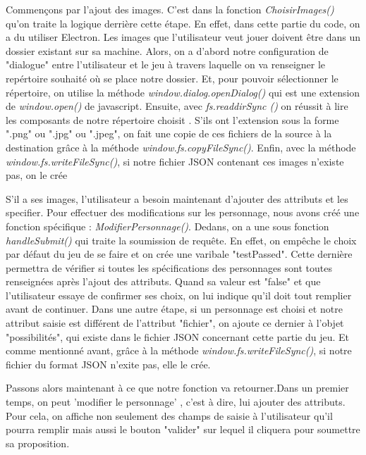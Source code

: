 \documentclass[a4paper, 12pt]{article}
\begin{document}
Commençons par l'ajout des images. C'est dans la fonction \textit{ChoisirImages()} qu'on traite la logique derrière cette étape. En effet, dans cette partie du code, on a du utiliser Electron.
Les images que l'utilisateur veut jouer doivent être dans un dossier existant sur sa machine. Alors, on a d'abord notre configuration de "dialogue" entre l'utilisateur et le jeu à travers laquelle on va renseigner le repértoire souhaité où se place notre dossier. Et, pour pouvoir sélectionner le répertoire, on utilise la méthode \textit{window.dialog.openDialog()} qui est une extension de \textit{window.open()} de javascript. Ensuite, avec \textit{fs.readdirSync ()}  on réussit à lire les composants de notre répertoire choisit . S'ils ont l'extension sous la forme ".png" ou ".jpg" ou ".jpeg", on fait une copie de ces fichiers de la source à la destination grâce à la méthode \textit{ window.fs.copyFileSync()}. 
Enfin, avec la méthode \textit{ window.fs.writeFileSync()}, si notre fichier JSON contenant ces images n'existe pas, on le crée\newline

S'il a ses images, l'utilisateur a besoin maintenant d'ajouter des attributs et les specifier.\newline
Pour effectuer des modifications sur les personnage, nous avons créé une fonction spécifique :\textit{ ModifierPersonnage()}. Dedans, on a une sous fonction \textit{handleSubmit() } qui traite la soumission de requête. En effet, on empêche le choix par défaut du jeu de se faire et on crée une varibale "testPassed". Cette dernière permettra de vérifier si toutes les spécifications des personnages sont toutes renseignées après l'ajout des attributs. Quand sa valeur est "false" et que l'utilisateur essaye de confirmer ses choix, on lui indique  qu'il doit  tout remplier avant de continuer. \newline
Dans une autre étape, si un personnage est choisi et notre attribut saisie est différent de l'attribut "fichier", on ajoute ce dernier à l'objet "possibilités", qui existe dans le fichier JSON concernant cette partie du jeu. Et comme mentionné avant, grâce à la méthode \textit{window.fs.writeFileSync()}, si notre fichier du format JSON n'exite pas, elle le crée. \newline

Passons alors maintenant à ce que notre fonction va retourner.Dans un premier temps, on peut 'modifier le personnage' , c'est à dire, lui ajouter des attributs. Pour cela, on affiche non seulement des champs de saisie à l'utilisateur qu'il pourra remplir mais aussi  le bouton "valider" sur lequel il cliquera pour soumettre sa proposition. \newline
\end{document}
